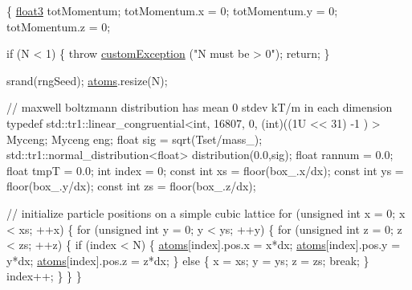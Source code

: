 \begin{DoxyCode}
                                                                               
                           \{
    \hyperlink{structfloat3}{float3} totMomentum;
    totMomentum.x = 0; totMomentum.y = 0; totMomentum.z = 0;

    \textcolor{keywordflow}{if} (N < 1) \{
        \textcolor{keywordflow}{throw} \hyperlink{classcustom_exception}{customException} (\textcolor{stringliteral}{"N must be > 0"});
        \textcolor{keywordflow}{return};
    \}

    srand(rngSeed);
    \hyperlink{classsystem_definition_ae8814d3f60fc1111af2a3f218a4bfcab}{atoms}.resize(N);

    \textcolor{comment}{// maxwell boltzmann distribution has mean 0 stdev kT/m in each dimension}
    \textcolor{keyword}{typedef} std::tr1::linear\_congruential<int, 16807, 0, (int)((1U << 31) -1 ) 
      > Myceng;
    Myceng eng;
    \textcolor{keywordtype}{float} sig = sqrt(Tset/mass\_);
    std::tr1::normal\_distribution<float> distribution(0.0,sig);
    \textcolor{keywordtype}{float} rannum = 0.0;
    \textcolor{keywordtype}{float} tmpT = 0.0;
    \textcolor{keywordtype}{int} index = 0;
    \textcolor{keyword}{const} \textcolor{keywordtype}{int} xs = floor(box\_.x/dx);
    \textcolor{keyword}{const} \textcolor{keywordtype}{int} ys = floor(box\_.y/dx);
    \textcolor{keyword}{const} \textcolor{keywordtype}{int} zs = floor(box\_.z/dx);
    
    \textcolor{comment}{// initialize particle positions on a simple cubic lattice}
    \textcolor{keywordflow}{for} (\textcolor{keywordtype}{unsigned} \textcolor{keywordtype}{int} x = 0; x < xs; ++x) \{
        \textcolor{keywordflow}{for} (\textcolor{keywordtype}{unsigned} \textcolor{keywordtype}{int} y = 0; y < ys; ++y) \{
            \textcolor{keywordflow}{for} (\textcolor{keywordtype}{unsigned} \textcolor{keywordtype}{int} z = 0; z < zs; ++z) \{
                \textcolor{keywordflow}{if} (index < N) \{
                    \hyperlink{classsystem_definition_ae8814d3f60fc1111af2a3f218a4bfcab}{atoms}[index].pos.x = x*dx;
                    \hyperlink{classsystem_definition_ae8814d3f60fc1111af2a3f218a4bfcab}{atoms}[index].pos.y = y*dx;
                    \hyperlink{classsystem_definition_ae8814d3f60fc1111af2a3f218a4bfcab}{atoms}[index].pos.z = z*dx;
                \} \textcolor{keywordflow}{else} \{
                    x = xs;
                    y = ys;
                    z = zs;
                    \textcolor{keywordflow}{break};
                \}
                index++;
            \}
        \}
    \}
    

\end{DoxyCode}
